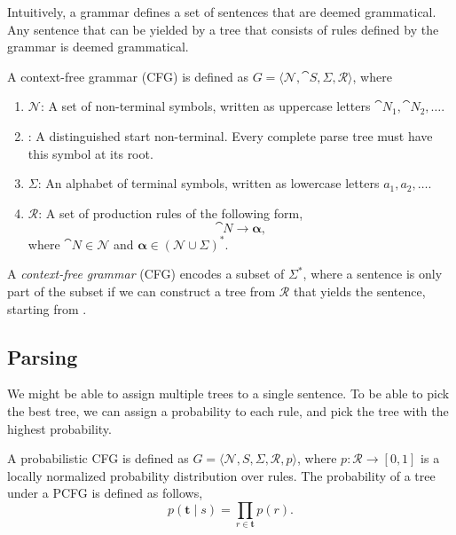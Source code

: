 Intuitively, a grammar defines a set of sentences that are deemed
grammatical. Any sentence that can be yielded by a tree that consists of
rules defined by the grammar is deemed grammatical.

\begin{definition}
  A context-free grammar (CFG) is defined as $G=\langle \mathcal{N}, \cat{S},
  \Sigma,\mathcal{R} \rangle$, where
  \begin{enumerate}
    \item $\mathcal{N}$: A set of non-terminal symbols, written as uppercase
      letters $\cat{N}_1, \cat{N}_2, \ldots$.
    \item {}: A distinguished start non-terminal. Every complete parse tree
      must have this symbol at its root.
    \item $\Sigma$: An alphabet of terminal symbols, written as lowercase
      letters $a_1,a_2,\ldots$.
    \item $\mathcal{R}$: A set of production rules of the following form, \[
        \cat{N} \to \bm{\alpha}
      ,\]
      where $\cat{N}\in\mathcal{N}$ and $\bm{\alpha}\in (\mathcal{N} \cup
      \Sigma)^*$.
  \end{enumerate}
\end{definition}

A \textit{context-free grammar} (CFG) encodes a subset of $\Sigma^*$, where a
sentence is only part of the subset if we can construct a tree from
$\mathcal{R}$ that yields the sentence, starting from .

\subsection{Parsing}

We might be able to assign multiple trees to a single sentence. To be able to
pick the best tree, we can assign a probability to each rule, and pick the
tree with the highest probability.

\begin{definition}

  A probabilistic CFG is defined as $G=\langle \mathcal{N}, S,
  \Sigma,\mathcal{R}, p \rangle$, where $p: \mathcal{R}\to [0,1]$ is a
  locally normalized probability distribution over rules. The probability of
  a tree under a PCFG is defined as follows, \[
    p(\bm{t} \mid s) = \prod_{r\in\bm{t}} p(r)
  .\]
\end{definition}

